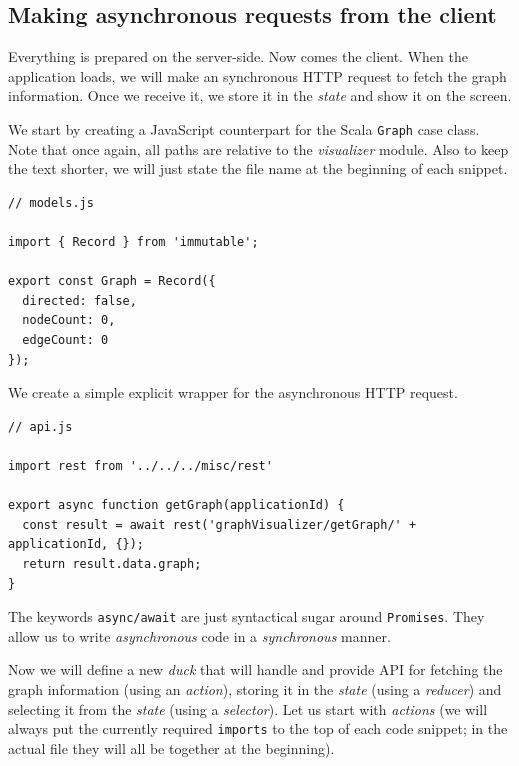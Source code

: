 \subsection{Making asynchronous requests from the client}

Everything is prepared on the server-side. Now comes the client. When the application loads, we will make an synchronous HTTP request to fetch the graph information. Once we receive it, we store it in the \emph{state} and show it on the screen.

We start by creating a JavaScript counterpart for the Scala \texttt{Graph} case class. Note that once again, all paths are relative to the \emph{visualizer} module. Also to keep the text shorter, we will just state the file name at the beginning of each snippet.

\begin{verbatim}
// models.js

import { Record } from 'immutable';

export const Graph = Record({
  directed: false,
  nodeCount: 0,
  edgeCount: 0
});
\end{verbatim}

We create a simple explicit wrapper for the asynchronous HTTP request.

\begin{verbatim}
// api.js

import rest from '../../../misc/rest'

export async function getGraph(applicationId) {
  const result = await rest('graphVisualizer/getGraph/' + applicationId, {});
  return result.data.graph;
}
\end{verbatim}

The keywords \texttt{async/await} are just syntactical sugar around \texttt{Promises}. They allow us to write \emph{asynchronous} code in a \emph{synchronous} manner.

Now we will define a new \emph{duck} that will handle and provide API for fetching the graph information (using an \emph{action}), storing it in the \emph{state} (using a \emph{reducer}) and selecting it from the \emph{state} (using a \emph{selector}). Let us start with \emph{actions} (we will always put the currently required \texttt{imports} to the top of each code snippet; in the actual file they will all be together at the beginning).

